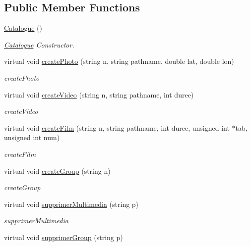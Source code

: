 \subsection*{Public Member Functions}
\begin{DoxyCompactItemize}
\item 
\hyperlink{classCatalogue_a406ca1384645f90d84076fa8b3f4b3f2}{Catalogue} ()
\begin{DoxyCompactList}\small\item\em \hyperlink{classCatalogue}{Catalogue} Constructor. \end{DoxyCompactList}\item 
virtual void \hyperlink{classCatalogue_aba54aa202119c2184dc18e5278f3ae59}{create\-Photo} (string n, string pathname, double lat, double lon)
\begin{DoxyCompactList}\small\item\em create\-Photo \end{DoxyCompactList}\item 
virtual void \hyperlink{classCatalogue_a59e7c173b7b7b889bb531a9b1048119e}{create\-Video} (string n, string pathname, int duree)
\begin{DoxyCompactList}\small\item\em create\-Video \end{DoxyCompactList}\item 
virtual void \hyperlink{classCatalogue_aeea731bce1425a52589a46f80af016c5}{create\-Film} (string n, string pathname, int duree, unsigned int $\ast$tab, unsigned int num)
\begin{DoxyCompactList}\small\item\em create\-Film \end{DoxyCompactList}\item 
virtual void \hyperlink{classCatalogue_a9e834d56a00f43b03f598a5459966d00}{create\-Group} (string n)
\begin{DoxyCompactList}\small\item\em create\-Group \end{DoxyCompactList}\item 
virtual void \hyperlink{classCatalogue_a88a9f6dcfac06d9a1eed7331ab3b1f40}{supprimer\-Multimedia} (string p)
\begin{DoxyCompactList}\small\item\em supprimer\-Multimedia \end{DoxyCompactList}\item 
virtual void \hyperlink{classCatalogue_a1839ba57f687e559fcf0251a6841624b}{supprimer\-Group} (string p)

\end{DoxyCompactItemize}
